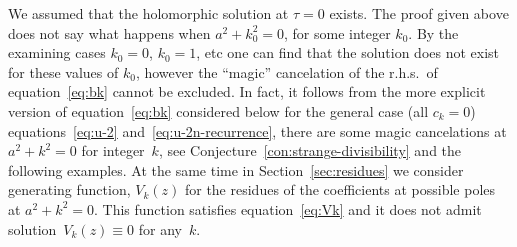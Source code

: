 \documentclass[pdftex]{sigma}
\numberwithin{equation}{section}
\begin{document}
\begin{Remark}\label{rem:a-imaginary-integer}We assumed that the holomorphic solution at $\tau=0$ exists. The proof given above does not say what
happens when $a^2+k_0^2=0$, for some integer $k_0$. By the examining cases $k_0=0$, $k_0=1$, etc one can find that
the solution does not exist for these values of $k_0$, however the ``magic'' cancelation of the r.h.s.\ of
equation~\eqref{eq:bk} cannot be excluded. In fact, it follows from the more explicit version of
equation~\eqref{eq:bk} considered below for the general case (all $c_k=0$) equations~\eqref{eq:u-2} and~\eqref{eq:u-2n-recurrence}, there are some magic cancelations at $a^2+k^2=0$ for integer~$k$, see
Conjecture~\ref{con:strange-divisibility} and the following examples. At the same time in Section~\ref{sec:residues}
we consider generating function, $V_k(z)$ for the residues of the coefficients at possible poles at $a^2+k^2=0$.
This function satisfies equation~\eqref{eq:Vk} and it does not admit solution~$V_k(z)\equiv0$ for any~$k$.
\end{Remark}
\end{document}
